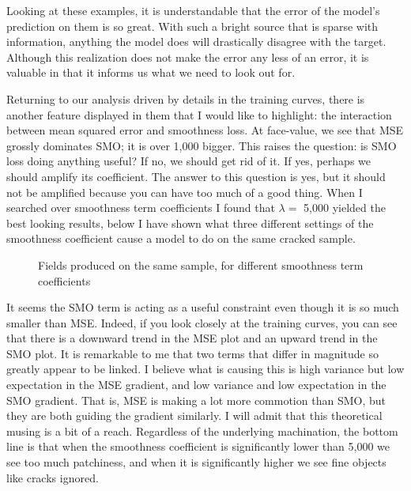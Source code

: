 \documentclass[12pt,a4paper]{article}
\begin{document}
Looking at these examples, it is understandable that the error of the model's prediction on them is so great. With such a bright source that is sparse with information, anything the model does will drastically disagree with the target. Although this realization does not make the error any less of an error, it is valuable in that it informs us what we need to look out for.

Returning to our analysis driven by details in the training curves, there is another feature displayed in them that I would like to highlight: the interaction between mean squared error and smoothness loss. At face-value, we see that MSE grossly dominates SMO; it is over 1,000 bigger. This raises the question: is SMO loss doing anything useful? If no, we should get rid of it. If yes, perhaps we should amplify its coefficient. The answer to this question is yes, but it should not be amplified because you can have too much of a good thing. When I searched over smoothness term coefficients I found that $\lambda =$ 5,000 yielded the best looking results, below I have shown what three different settings of the smoothness coefficient cause a model to do on the same cracked sample.

\begin{figure}[ht]%
    \centering
	\qquad
    \qquad
    \caption{Fields produced on the same sample, for different smoothness term coefficients}%
\end{figure}

It seems the SMO term is acting as a useful constraint even though it is so much smaller than MSE. Indeed, if you look closely at the training curves, you can see that there is a downward trend in the MSE plot and an upward trend in the SMO plot. It is remarkable to me that two terms that differ in magnitude so greatly appear to be linked. I believe what is causing this is high variance but low expectation in the MSE gradient, and low variance and low expectation in the SMO gradient. That is, MSE is making a lot more commotion than SMO, but they are both guiding the gradient similarly. I will admit that this theoretical musing is a bit of a reach. Regardless of the underlying machination, the bottom line is that when the smoothness coefficient is significantly lower than 5,000 we see too much patchiness, and when it is significantly higher we see fine objects like cracks ignored.
\end{document}
